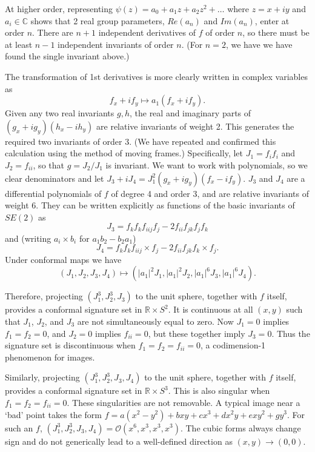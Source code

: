 \documentclass[review,onefignum,onetabnum]{siamonline190516}
\def\R{\mathbb{R}}
\begin{document}
At higher order,  representing $\psi(z) = a_0 + a_1 z + a_2 z^2 + \dots$ where $z=x+iy$ and $a_i\in \mathbb{C}$ shows that 2 real group parameters, $Re(a_n)$ and $Im(a_n)$, enter at order $n$. There are $n+1$ independent derivatives of $f$ of order $n$, so there must be at least $n-1$ independent invariants of order $n$. (For $n=2$, we have we have found the single invariant above.)

The transformation of 1st derivatives is more clearly written in complex variables as $$ f_x + i f_y \mapsto a_1 (f_x + i f_y).$$ Given any two real invariants $g,h$, the real and imaginary parts of $(g_x+i g_y)(h_x-i h_y)$ are relative invariants of weight 2. This generates the required two invariants of order 3. (We have repeated and confirmed this calculation using the method of moving frames.) Specifically, let $J_1 = f_i f_i$ and  $J_2 = f_{ii}$, so that  $g = J_2/J_1$ is invariant.  We want to work with polynomials, so we clear denominators and let $J_3+iJ_4 = J_1^2 (g_x + i g_y)  (f_x - i f_y)$. $J_3$ and $J_4$ are a differential polynomials of $f$ of degree 4 and order 3, and are relative invariants of weight 6. They can be written explicitly as functions of the basic invariants of $SE(2)$ as
$$J_3 = f_k f_k f_{iij}f_j - 2 f_{ii} f_{jk} f_j f_k$$
and (writing $a_i\times b_i$ for $a_1 b_2 - b_2 a_1$)
$$ J_4 = f_k f_k f_{iij}\times f_j - 2 f_{ii} f_{jk} f_k\times f_j.$$
Under conformal maps we have
$$ (J_1,J_2,J_3,J_4) \mapsto (|a_1|^2 J_1, |a_1|^2 J_2, |a_1|^6 J_3,|a_1|^6 J_4).$$

Therefore, projecting $(J_1^3,J_2^3,J_3)$ to the unit sphere, together with $f$ itself, provides a conformal signature set in $\R\times S^2$. It is continuous at all $(x,y)$ such that $J_1$, $J_2$, and $J_3$ are not simultaneously equal to zero.  Now $J_1=0$ implies $f_1=f_2=0$, and $J_2=0$ implies $f_{ii}=0$, but these together imply $J_3=0$. Thus the signature set is discontinuous when $f_1=f_2=f_{ii}=0$, a codimension-1 phenomenon for images.

Similarly, projecting $(J_1^3,J_2^3,J_3,J_4)$ to the unit sphere, together with $f$ itself, provides a conformal signature set in $\R\times S^3$. This is also singular when $f_1=f_2=f_{ii}=0$. These singularities are not removable. A typical image near a `bad' point takes the form $f = a(x^2-y^2) + b x y + c x^3 + d x^2 y + e x y^2 + g y^3$.  For such an $f$, $(J_1^3,J_2^3,J_3,J_4)=\mathcal{O}(x^6,x^3,x^3,x^3)$.  The cubic forms always change sign and do not generically lead to a well-defined direction as $(x,y)\to(0,0)$. 
\end{document}
